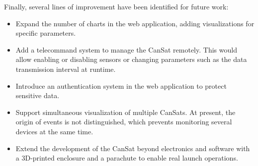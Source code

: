 Finally, several lines of improvement have been identified for future work:

\begin{itemize}
    \item Expand the number of charts in the web application, adding visualizations for specific parameters.
    \item Add a telecommand system to manage the CanSat remotely. This would allow enabling or disabling sensors or changing parameters such as the data transmission interval at runtime.
    \item Introduce an authentication system in the web application to protect sensitive data.
    \item Support simultaneous visualization of multiple CanSats. At present, the origin of events is not distinguished, which prevents monitoring several devices at the same time.
    \item Extend the development of the CanSat beyond electronics and software with a 3D-printed enclosure and a parachute to enable real launch operations.
\end{itemize}




